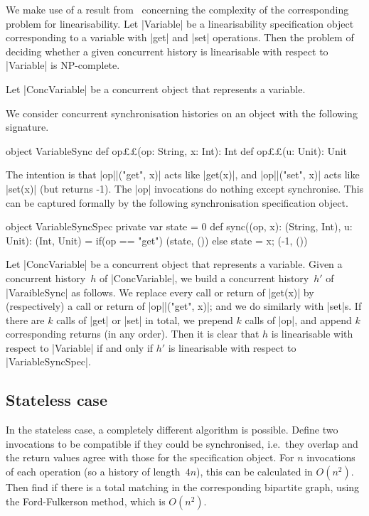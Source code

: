 We make use of a result from~\cite{???} concerning the complexity of the
corresponding problem for linearisability.  Let |Variable| be a
linearisability specification object corresponding to a variable with |get|
and |set| operations.  Then the problem of deciding whether a given concurrent
history is linearisable with respect to |Variable| is NP-complete.

Let |ConcVariable| be a concurrent object that represents a variable.  

We consider concurrent synchronisation histories on an object with the
following signature.   
\begin{scala}
object VariableSync{
  def op££(op: String, x: Int): Int
  def op££(u: Unit): Unit
} 
\end{scala}
%
The intention is that |op||("get", x)| acts like |get(x)|, and
|op||("set", x)| acts like |set(x)| (but returns -1).  The |op|
invocations do nothing except synchronise.  This can be captured formally by
the following synchronisation specification object.

\begin{scala}
object VariableSyncSpec{
  private var state = 0
  def sync((op, x): (String, Int), u: Unit): (Int, Unit) = 
    if(op == "get") (state, ()) else{ state = x; (-1, ()) }
}
\end{scala}


Let |ConcVariable| be a concurrent object that represents a variable.  Given a
concurrent history~$h$ of |ConcVariable|, we build a concurrent history~$h'$
of |VaraibleSync| as follows.  We replace every call or return of |get(x)| by
(respectively) a call or return of |op||("get", x)|; and we do similarly
with |set|s.  If there are $k$ calls of |get| or |set| in total, we prepend
$k$ calls of |op|, and append $k$ corresponding returns (in any order).
Then it is clear that $h$ is linearisable with respect to |Variable| if and
only if $h'$ is linearisable with respect to |VariableSyncSpec|.


\subsection{Stateless case}

In the stateless case, a completely different algorithm is possible.  Define
two invocations to be compatible if they could be synchronised, i.e.~they
overlap and the return values agree with those for the specification object.
For $n$ invocations of each operation (so a history of length~$4n$), this can
be calculated in $O(n^2)$.  Then find if there is a total matching in the
corresponding bipartite graph, using the Ford-Fulkerson method, which is
$O(n^2)$.
